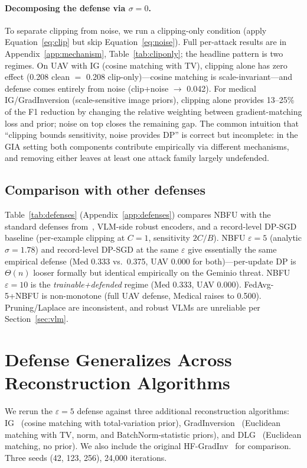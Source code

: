 \documentclass[11pt]{article}
\begin{document}
\paragraph{Decomposing the defense via $\sigma{=}0$.}
To separate clipping from noise, we run a clipping-only condition (apply Equation~\ref{eq:clip} but skip Equation~\ref{eq:noise}). Full per-attack results are in Appendix~\ref{app:mechanism}, Table~\ref{tab:cliponly}; the headline pattern is two regimes. On UAV with IG (cosine matching with TV), clipping alone has zero effect (0.208 clean $=$ 0.208 clip-only)---cosine matching is scale-invariant---and defense comes entirely from noise (clip+noise $\to$ 0.042). For medical IG/GradInversion (scale-sensitive image priors), clipping alone provides 13--25\% of the F1 reduction by changing the relative weighting between gradient-matching loss and prior; noise on top closes the remaining gap. The common intuition that ``clipping bounds sensitivity, noise provides DP'' is correct but incomplete: in the GIA setting both components contribute empirically via different mechanisms, and removing either leaves at least one attack family largely undefended.

\subsection{Comparison with other defenses}
\label{sec:defenses-comparison}
Table~\ref{tab:defenses} (Appendix~\ref{app:defenses}) compares NBFU with the standard defenses from~\citet{geminio2024}, VLM-side robust encoders, and a record-level DP-SGD baseline (per-example clipping at $C{=}1$, sensitivity $2C/B$). NBFU $\varepsilon{=}5$ (analytic $\sigma{=}1.78$) and record-level DP-SGD at the same $\varepsilon$ give essentially the same empirical defense (Med 0.333 vs.\ 0.375, UAV 0.000 for both)---per-update DP is $\Theta(n)$ looser formally but identical empirically on the Geminio threat. NBFU $\varepsilon{=}10$ is the \emph{trainable+defended} regime (Med 0.333, UAV 0.000). FedAvg-5+NBFU is non-monotone (full UAV defense, Medical raises to 0.500). Pruning/Laplace are inconsistent, and robust VLMs are unreliable per Section~\ref{sec:vlm}.


\section{Defense Generalizes Across Reconstruction Algorithms}
\label{sec:generalize}

We rerun the $\varepsilon{=}5$ defense against three additional reconstruction algorithms: IG~\citep{ig2020} (cosine matching with total-variation prior), GradInversion~\citep{gradinversion2021} (Euclidean matching with TV, norm, and BatchNorm-statistic priors), and DLG~\citep{dlg2019} (Euclidean matching, no prior). We also include the original HF-GradInv~\citep{hfgradinv2024} for comparison. Three seeds (42, 123, 256), 24{,}000 iterations.
\end{document}
